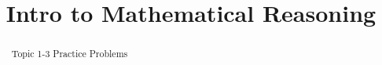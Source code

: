 \documentclass{xourse}
\title{Intro to Mathematical Reasoning}
\begin{document}
\begin{abstract}
Topic 1-3 Practice Problems
\end{abstract}
\maketitle

%   


\end{document}
